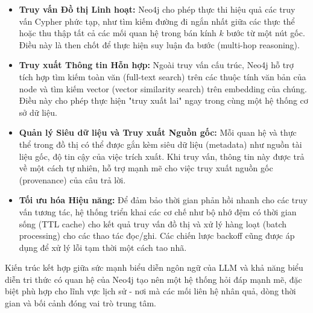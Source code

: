 \begin{itemize}
    \item \textbf{Truy vấn Đồ thị Linh hoạt:} Neo4j cho phép thực thi hiệu quả các truy vấn Cypher phức tạp, như tìm kiếm đường đi ngắn nhất giữa các thực thể hoặc thu thập tất cả các mối quan hệ trong bán kính \(k\) bước từ một nút gốc. Điều này là then chốt để thực hiện suy luận đa bước (multi-hop reasoning).

    \item \textbf{Truy xuất Thông tin Hỗn hợp:} Ngoài truy vấn cấu trúc, Neo4j hỗ trợ tích hợp tìm kiếm toàn văn (full-text search) trên các thuộc tính văn bản của node và tìm kiếm vector (vector similarity search) trên embedding của chúng. Điều này cho phép thực hiện "truy xuất lai" ngay trong cùng một hệ thống cơ sở dữ liệu.

    \item \textbf{Quản lý Siêu dữ liệu và Truy xuất Nguồn gốc:} Mỗi quan hệ và thực thể trong đồ thị có thể được gắn kèm siêu dữ liệu (metadata) như nguồn tài liệu gốc, độ tin cậy của việc trích xuất. Khi truy vấn, thông tin này được trả về một cách tự nhiên, hỗ trợ mạnh mẽ cho việc truy xuất nguồn gốc (provenance) của câu trả lời.

    \item \textbf{Tối ưu hóa Hiệu năng:} Để đảm bảo thời gian phản hồi nhanh cho các truy vấn tương tác, hệ thống triển khai các cơ chế như bộ nhớ đệm có thời gian sống (TTL cache) cho kết quả truy vấn đồ thị và xử lý hàng loạt (batch processing) cho các thao tác đọc/ghi. Các chiến lược backoff cũng được áp dụng để xử lý lỗi tạm thời một cách tao nhã.
\end{itemize}

Kiến trúc kết hợp giữa sức mạnh biểu diễn ngôn ngữ của LLM và khả năng biểu diễn tri thức có quan hệ của Neo4j tạo nên một hệ thống hỏi đáp mạnh mẽ, đặc biệt phù hợp cho lĩnh vực lịch sử - nơi mà các mối liên hệ nhân quả, dòng thời gian và bối cảnh đóng vai trò trung tâm.

